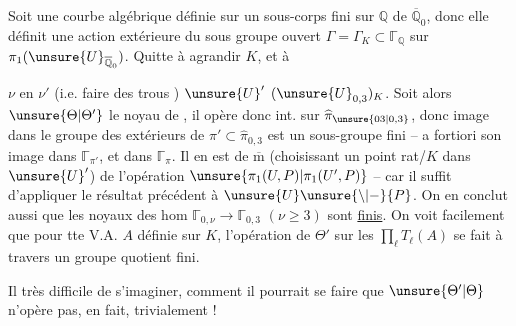 Soit une courbe algébrique  définie sur un sous-corps  fini sur $\mathbb Q$ de $\overline{\mathbb Q}_0$, donc elle définit une action extérieure du sous groupe ouvert $\Gamma=\Gamma_K\subset\mathbb{\Gamma}_{\mathbb Q}$ sur $\pi_1(\unsure{U}_{\overline{\mathbb Q}_0})$.  Quitte à agrandir $K$,  et à 


$\nu$ en $\nu'$ (i.e. faire des trous )  $\unsure{U}'$   $(\unsure{U}_{0,3})_K$.
 
Soit alors $\unsure{\Theta|\Theta'}$ le noyau de
,
il opère donc   int. sur $\widehat{\pi}_{\unsure{03|0,3}}$, donc image  dans le groupe des  extérieurs de $\pi'\subset\widehat{\pi}_{0,3}$ est un sous-groupe fini -- a fortiori son image dans $\mathbb{\Gamma}_{\pi'}$, et dans  $\mathbb{\Gamma}_{\pi}$. Il en est de $\overline{\mathrm m}$ (choisissant un point  rat/$K$ dans $\unsure{U}'$) de l'opération   $\unsure{\pi_1(U,P)|\pi_1(U',P)}$ -- car il suffit d'appliquer le résultat précédent à $\unsure{U}\unsure{\backslash|-}\{P\}$. On en conclut aussi que  les noyaux des hom $\mathbb{\Gamma}_{0,\nu}\longrightarrow\mathbb{\Gamma}_{0,3}$ $(\nu\geq3)$ sont \uline{finis}. On voit facilement que pour tte V.A. $A$ définie sur $K$, l'opération de $\Theta'$ sur les $\prod_\ell T_\ell(A)$ se fait à travers un groupe quotient fini.

Il  très difficile de s'imaginer, comment il \unsure{\deleted{$\Theta$}} pourrait se faire que $\unsure{\Theta'|\Theta}$ n'opère pas, en fait, trivialement ! 


